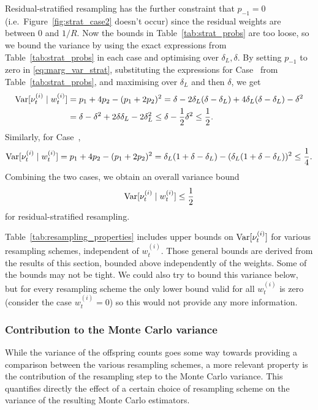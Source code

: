 Residual-stratified resampling has the further constraint that $p_{-1} =0$ (i.e.\ Figure~\ref{fig:strat_case2} doesn't occur) since the residual weights are between $0$ and $1/R$. Now the bounds in Table~\ref{tab:strat_probs} are too loose, so we bound the variance by using the exact expressions from Table~\ref{tab:strat_probs} in each case and optimising over $\delta_L, \delta$.
By setting $p_{-1}$ to zero in \eqref{eq:marg_var_strat}, substituting the expressions for Case~ from Table~\ref{tab:strat_probs}, and maximising over $\delta_L$ and then $\delta$, we get
\begin{align*}
\operatorname{Var}[ \nu_t^{(i)} \mid w_t^{(i)} ]
&= p_1 + 4p_2 - (p_1 + 2p_2)^2 
= \delta - 2\delta_L(\delta-\delta_L) + 4\delta_L(\delta-\delta_L) -\delta^2 \\
&= \delta - \delta^2 + 2\delta\delta_L - 2\delta_L^2
\leq \delta - \frac{1}{2}\delta^2
\leq \frac{1}{2} .
\end{align*}
Similarly, for Case~,
\begin{equation*}
\operatorname{Var}[ \nu_t^{(i)} \mid w_t^{(i)} ]
= p_1 + 4p_2 - (p_1 + 2p_2)^2 
= \delta_L(1+\delta-\delta_L) - (\delta_L(1+\delta-\delta_L))^2
\leq \frac{1}{4} .
\end{equation*}
Combining the two cases, we obtain an overall variance bound
\begin{equation*}
\operatorname{Var}[ \nu_t^{(i)} \mid w_t^{(i)} ]
\leq \frac{1}{2}
\end{equation*}
for residual-stratified resampling.

Table~\ref{tab:resampling_properties} includes upper bounds on $\operatorname{Var}[\nu_t^{(i)}]$ for various resampling schemes, independent of $w_t^{(i)}$. Those general bounds are derived from the results of this section, bounded above independently of the weights. Some of the bounds may not be tight.
We could also try to bound this variance below, but for every resampling scheme the only lower bound valid for all $w_t^{(i)}$ is zero (consider the case $w_t^{(i)}=0$) so this would not provide any more information.





\subsubsection{Contribution to the Monte Carlo variance}
While the variance of the offspring counts goes some way towards providing a comparison between the various resampling schemes, a more relevant property is the contribution of the resampling step to the Monte Carlo variance.
This quantifies directly the effect of a certain choice of resampling scheme on the variance of the resulting Monte Carlo estimators.

